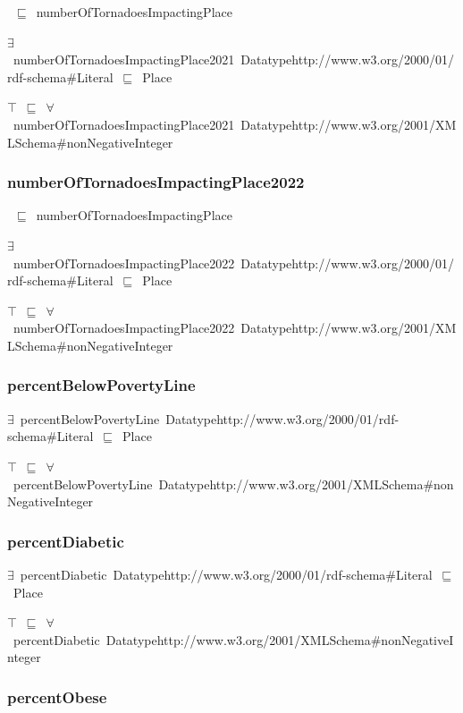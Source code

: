 \documentclass{article}
\begin{document}
~\ensuremath{\sqsubseteq}~numberOfTornadoesImpactingPlace

\ensuremath{\exists}~numberOfTornadoesImpactingPlace2021~Datatypehttp://www.w3.org/2000/01/rdf-schema#Literal~\ensuremath{\sqsubseteq}~Place

\ensuremath{\top}~\ensuremath{\sqsubseteq}~\ensuremath{\forall}~numberOfTornadoesImpactingPlace2021~Datatypehttp://www.w3.org/2001/XMLSchema#nonNegativeInteger

\subsubsection*{numberOfTornadoesImpactingPlace2022}

~\ensuremath{\sqsubseteq}~numberOfTornadoesImpactingPlace

\ensuremath{\exists}~numberOfTornadoesImpactingPlace2022~Datatypehttp://www.w3.org/2000/01/rdf-schema#Literal~\ensuremath{\sqsubseteq}~Place

\ensuremath{\top}~\ensuremath{\sqsubseteq}~\ensuremath{\forall}~numberOfTornadoesImpactingPlace2022~Datatypehttp://www.w3.org/2001/XMLSchema#nonNegativeInteger

\subsubsection*{percentBelowPovertyLine}

\ensuremath{\exists}~percentBelowPovertyLine~Datatypehttp://www.w3.org/2000/01/rdf-schema#Literal~\ensuremath{\sqsubseteq}~Place

\ensuremath{\top}~\ensuremath{\sqsubseteq}~\ensuremath{\forall}~percentBelowPovertyLine~Datatypehttp://www.w3.org/2001/XMLSchema#nonNegativeInteger

\subsubsection*{percentDiabetic}

\ensuremath{\exists}~percentDiabetic~Datatypehttp://www.w3.org/2000/01/rdf-schema#Literal~\ensuremath{\sqsubseteq}~Place

\ensuremath{\top}~\ensuremath{\sqsubseteq}~\ensuremath{\forall}~percentDiabetic~Datatypehttp://www.w3.org/2001/XMLSchema#nonNegativeInteger

\subsubsection*{percentObese}
\end{document}
